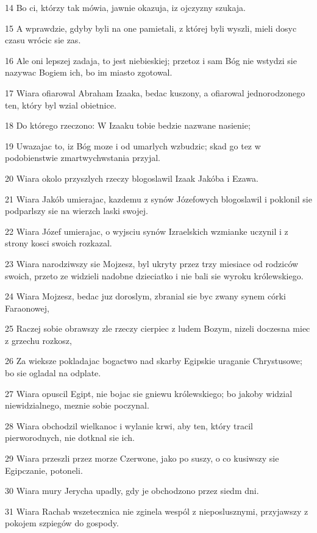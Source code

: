 \par 14 Bo ci, którzy tak mówia, jawnie okazuja, iz ojczyzny szukaja.
\par 15 A wprawdzie, gdyby byli na one pamietali, z której byli wyszli, mieli dosyc czasu wrócic sie zas.
\par 16 Ale oni lepszej zadaja, to jest niebieskiej; przetoz i sam Bóg nie wstydzi sie nazywac Bogiem ich, bo im miasto zgotowal.
\par 17 Wiara ofiarowal Abraham Izaaka, bedac kuszony, a ofiarowal jednorodzonego ten, który byl wzial obietnice.
\par 18 Do którego rzeczono: W Izaaku tobie bedzie nazwane nasienie;
\par 19 Uwazajac to, iz Bóg moze i od umarlych wzbudzic; skad go tez w podobienstwie zmartwychwstania przyjal.
\par 20 Wiara okolo przyszlych rzeczy blogoslawil Izaak Jakóba i Ezawa.
\par 21 Wiara Jakób umierajac, kazdemu z synów Józefowych blogoslawil i poklonil sie podparlszy sie na wierzch laski swojej.
\par 22 Wiara Józef umierajac, o wyjsciu synów Izraelskich wzmianke uczynil i z strony kosci swoich rozkazal.
\par 23 Wiara narodziwszy sie Mojzesz, byl ukryty przez trzy miesiace od rodziców swoich, przeto ze widzieli nadobne dzieciatko i nie bali sie wyroku królewskiego.
\par 24 Wiara Mojzesz, bedac juz doroslym, zbranial sie byc zwany synem córki Faraonowej,
\par 25 Raczej sobie obrawszy zle rzeczy cierpiec z ludem Bozym, nizeli doczesna miec z grzechu rozkosz,
\par 26 Za wieksze pokladajac bogactwo nad skarby Egipskie uraganie Chrystusowe; bo sie ogladal na odplate.
\par 27 Wiara opuscil Egipt, nie bojac sie gniewu królewskiego; bo jakoby widzial niewidzialnego, meznie sobie poczynal.
\par 28 Wiara obchodzil wielkanoc i wylanie krwi, aby ten, który tracil pierworodnych, nie dotknal sie ich.
\par 29 Wiara przeszli przez morze Czerwone, jako po suszy, o co kusiwszy sie Egipczanie, potoneli.
\par 30 Wiara mury Jerycha upadly, gdy je obchodzono przez siedm dni.
\par 31 Wiara Rachab wszetecznica nie zginela wespól z nieposlusznymi, przyjawszy z pokojem szpiegów do gospody.
